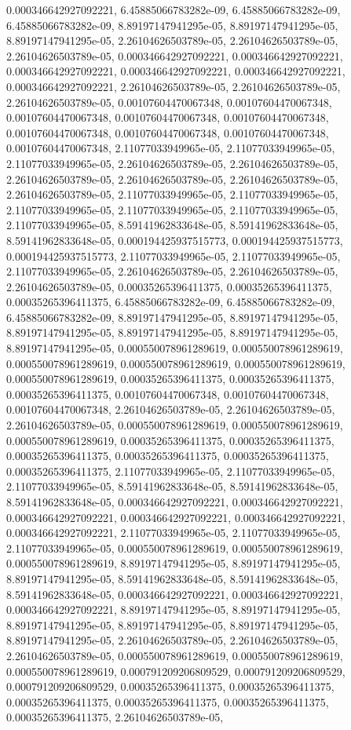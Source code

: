 \documentclass[
  ,man]{apa6}
\begin{document}
0.000346642927092221, 6.45885066783282e-09, 6.45885066783282e-09, 6.45885066783282e-09, 8.89197147941295e-05, 8.89197147941295e-05, 8.89197147941295e-05, 2.26104626503789e-05, 2.26104626503789e-05, 2.26104626503789e-05, 0.000346642927092221, 0.000346642927092221, 0.000346642927092221, 0.000346642927092221, 0.000346642927092221, 0.000346642927092221, 2.26104626503789e-05, 2.26104626503789e-05, 2.26104626503789e-05, 0.00107604470067348, 0.00107604470067348, 0.00107604470067348, 0.00107604470067348,
0.00107604470067348, 0.00107604470067348, 0.00107604470067348, 0.00107604470067348, 0.00107604470067348, 2.11077033949965e-05, 2.11077033949965e-05, 2.11077033949965e-05, 2.26104626503789e-05, 2.26104626503789e-05, 2.26104626503789e-05, 2.26104626503789e-05, 2.26104626503789e-05, 2.26104626503789e-05, 2.11077033949965e-05, 2.11077033949965e-05, 2.11077033949965e-05, 2.11077033949965e-05, 2.11077033949965e-05, 2.11077033949965e-05, 8.59141962833648e-05, 8.59141962833648e-05, 8.59141962833648e-05,
0.000194425937515773, 0.000194425937515773, 0.000194425937515773, 2.11077033949965e-05, 2.11077033949965e-05, 2.11077033949965e-05, 2.26104626503789e-05, 2.26104626503789e-05, 2.26104626503789e-05, 0.00035265396411375, 0.00035265396411375, 0.00035265396411375, 6.45885066783282e-09, 6.45885066783282e-09, 6.45885066783282e-09, 8.89197147941295e-05, 8.89197147941295e-05, 8.89197147941295e-05, 8.89197147941295e-05, 8.89197147941295e-05, 8.89197147941295e-05, 0.000550078961289619, 0.000550078961289619,
0.000550078961289619, 0.000550078961289619, 0.000550078961289619, 0.000550078961289619, 0.00035265396411375, 0.00035265396411375, 0.00035265396411375, 0.00107604470067348, 0.00107604470067348, 0.00107604470067348, 2.26104626503789e-05, 2.26104626503789e-05, 2.26104626503789e-05, 0.000550078961289619, 0.000550078961289619, 0.000550078961289619, 0.00035265396411375, 0.00035265396411375, 0.00035265396411375, 0.00035265396411375, 0.00035265396411375, 0.00035265396411375, 2.11077033949965e-05, 2.11077033949965e-05,
2.11077033949965e-05, 8.59141962833648e-05, 8.59141962833648e-05, 8.59141962833648e-05, 0.000346642927092221, 0.000346642927092221, 0.000346642927092221, 0.000346642927092221, 0.000346642927092221, 0.000346642927092221, 2.11077033949965e-05, 2.11077033949965e-05, 2.11077033949965e-05, 0.000550078961289619, 0.000550078961289619, 0.000550078961289619, 8.89197147941295e-05, 8.89197147941295e-05, 8.89197147941295e-05, 8.59141962833648e-05, 8.59141962833648e-05, 8.59141962833648e-05, 0.000346642927092221,
0.000346642927092221, 0.000346642927092221, 8.89197147941295e-05, 8.89197147941295e-05, 8.89197147941295e-05, 8.89197147941295e-05, 8.89197147941295e-05, 8.89197147941295e-05, 2.26104626503789e-05, 2.26104626503789e-05, 2.26104626503789e-05, 0.000550078961289619, 0.000550078961289619, 0.000550078961289619, 0.000791209206809529, 0.000791209206809529, 0.000791209206809529, 0.00035265396411375, 0.00035265396411375, 0.00035265396411375, 0.00035265396411375, 0.00035265396411375, 0.00035265396411375, 2.26104626503789e-05,
\end{document}
